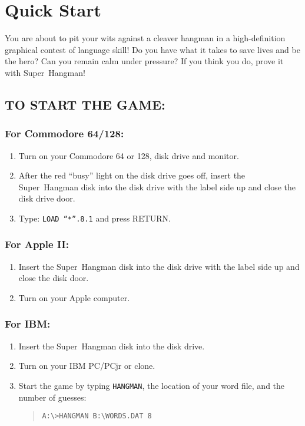 
\lhead[\chaptername~\thechapter]{\rightmark}


\rhead[\leftmark]{}


\lfoot[\thepage]{}


\cfoot{}


\rfoot[]{\thepage}


\chapter{Quick Start}

You are about to pit your wits against a cleaver hangman in a high-definition
graphical contest of language skill! Do you have what it takes to
save lives and be the hero? Can you remain calm under pressure? If
you think you do, prove it with \mbox{Super Hangman}!


\section{TO START THE GAME:}


\subsection{For Commodore 64/128:}
\begin{enumerate}
\item Turn on your Commodore 64 or 128, disk drive and monitor.
\item After the red ``busy'' light on the disk drive goes off, insert
the \mbox{Super Hangman} disk into the disk drive with the label
side up and close the disk drive door.
\item Type: \texttt{LOAD ``{*}''.8.1} and press RETURN.
\end{enumerate}

\subsection{For Apple II:}
\begin{enumerate}
\item Insert the \mbox{Super Hangman} disk into the disk drive with the
label side up and close the disk door.
\item Turn on your Apple computer.
\end{enumerate}

\subsection{For IBM:}
\begin{enumerate}
\item Insert the \mbox{Super Hangman} disk into the disk drive.
\item Turn on your IBM PC/PCjr or clone.
\item Start the game by typing \texttt{HANGMAN}, the location of your word
file, and the number of guesses:

\begin{quote}
\texttt{A:\textbackslash{}>HANGMAN B:\textbackslash{}WORDS.DAT 8}
\end{quote}
\end{enumerate}

